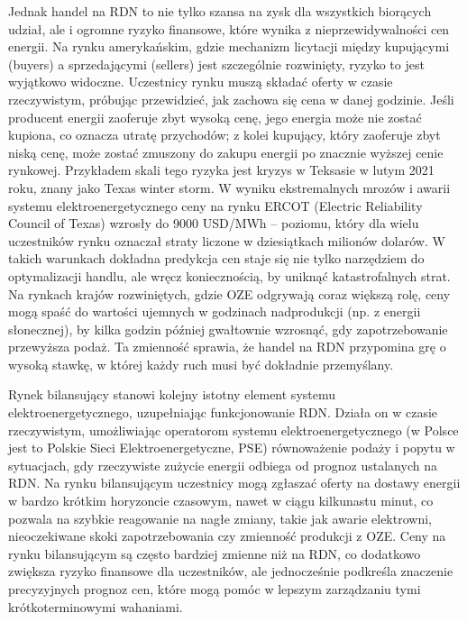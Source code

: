 Jednak handel na RDN to nie tylko szansa na zysk dla wszystkich biorących udział, ale i ogromne ryzyko finansowe, które wynika z nieprzewidywalności cen energii. Na rynku amerykańskim, gdzie mechanizm licytacji między kupującymi (buyers) a sprzedającymi (sellers) jest szczególnie rozwinięty, ryzyko to jest wyjątkowo widoczne. Uczestnicy rynku muszą składać oferty w czasie rzeczywistym, próbując przewidzieć, jak zachowa się cena w danej godzinie. Jeśli producent energii zaoferuje zbyt wysoką cenę, jego energia może nie zostać kupiona, co oznacza utratę przychodów; z kolei kupujący, który zaoferuje zbyt niską cenę, może zostać zmuszony do zakupu energii po znacznie wyższej cenie rynkowej. Przykładem skali tego ryzyka jest kryzys w Teksasie \cite{BUSBY2021102106} w lutym 2021 roku, znany jako Texas winter storm. W wyniku ekstremalnych mrozów i awarii systemu elektroenergetycznego ceny na rynku ERCOT (Electric Reliability Council of Texas) wzrosły do 9000 USD/MWh – poziomu, który dla wielu uczestników rynku oznaczał straty liczone w dziesiątkach milionów dolarów. W takich warunkach dokładna predykcja cen staje się nie tylko narzędziem do optymalizacji handlu, ale wręcz koniecznością, by uniknąć katastrofalnych strat. Na rynkach krajów rozwiniętych, gdzie OZE odgrywają coraz większą rolę, ceny mogą spaść do wartości ujemnych w godzinach nadprodukcji (np. z energii słonecznej), by kilka godzin później gwałtownie wzrosnąć, gdy zapotrzebowanie przewyższa podaż. Ta zmienność sprawia, że handel na RDN przypomina grę o wysoką stawkę, w której każdy ruch musi być dokładnie przemyślany.

Rynek bilansujący stanowi kolejny istotny element systemu elektroenergetycznego, uzupełniając funkcjonowanie RDN. Działa on w czasie rzeczywistym, umożliwiając operatorom systemu elektroenergetycznego (w Polsce jest to Polskie Sieci Elektroenergetyczne, PSE) równoważenie podaży i popytu w sytuacjach, gdy rzeczywiste zużycie energii odbiega od prognoz ustalanych na RDN. Na rynku bilansującym uczestnicy mogą zgłaszać oferty na dostawy energii w bardzo krótkim horyzoncie czasowym, nawet w ciągu kilkunastu minut, co pozwala na szybkie reagowanie na nagłe zmiany, takie jak awarie elektrowni, nieoczekiwane skoki zapotrzebowania czy zmienność produkcji z OZE. Ceny na rynku bilansującym są często bardziej zmienne niż na RDN, co dodatkowo zwiększa ryzyko finansowe dla uczestników, ale jednocześnie podkreśla znaczenie precyzyjnych prognoz cen, które mogą pomóc w lepszym zarządzaniu tymi krótkoterminowymi wahaniami.

